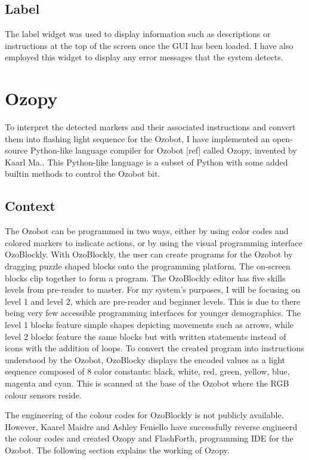 \documentclass[oneside,%
                    author={Malak Hajji},
                    degree={BSc},
                    title={Designing An Accessible Computational Toolkit For Students},
                  subtitle={With Mixed Visual Abilities}]{dissertation}
\begin{document}
\subsection{Label}
The label widget was used to display information such as descriptions or instructions at the top of the screen once the GUI has been loaded. I have also employed this widget to display any error messages that the system detects.

\section{Ozopy}
To interpret the detected markers and their associated instructions and convert them into flashing light sequence for the Ozobot, I have implemented an open-source Python-like language compiler for Ozobot [ref] called Ozopy, invented by Kaarl Ma..  This Python-like language is a subset of Python with some added builtin methods to control the Ozobot bit.

\subsection{Context}

The Ozobot can be programmed in two ways, either by using color codes and colored markers to indicate actions, or by using the visual programming interface OzoBlockly. With OzoBlockly, the user can create programs for the Ozobot by dragging puzzle shaped blocks onto the programming platform. The on-screen blocks clip together to form a program. The OzoBlockly editor has five skills levels from pre-reader to master.
For my system’s purposes, I will be focusing on level 1 and level 2, which are pre-reader and beginner levels. This is due to there being very few accessible programming interfaces for younger demographics. The level 1 blocks feature simple shapes depicting movements such as arrows, while level 2 blocks feature the same blocks but with written statements instead of icons with the addition of loops. 
To convert the created program into instructions understood by the Ozobot, OzoBlocky displays the encoded values as a light sequence composed of 8 color constants: black, white, red, green, yellow, blue, magenta and cyan. This is scanned at the base of the Ozobot where the RGB colour sensors reside. 

The engineering of the colour codes for OzoBlockly is not publicly available. However, Kaarel Maidre and Ashley Feniello have successfully reverse engineerd the colour codes and created Ozopy and FlashForth, programming IDE for the Ozobot. The following section explains the working of Ozopy.  
\end{document}
